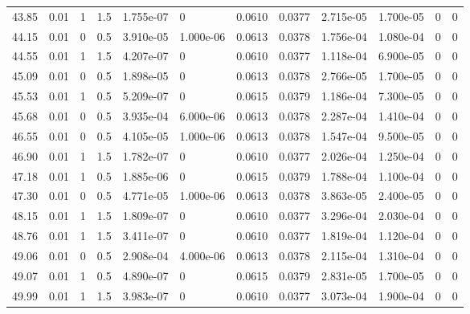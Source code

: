 \documentclass[preview]{standalone}
\begin{document}
{{{\begin{tabular}{L{1.2cm}C{1.2cm} C{0.3cm}C{0.5cm} C{1.4cm}C{1.4cm} C{1.4cm}C{1.4cm} C{1.6cm}C{1.6cm} C{1.6cm}C{1.6cm}}
  43.85  &  0.01  & 1     & 1.5 &  1.755e-07  & 0  &  0.0610&   0.0377& 2.715e-05 & 1.700e-05   &  0 & 0  \\ 
  44.15  &  0.01  & 0     & 0.5 &  3.910e-05  & 1.000e-06  &  0.0613&   0.0378& 1.756e-04 & 1.080e-04   &  0 & 0  \\ 
  44.55  &  0.01  & 1     & 1.5 &  4.207e-07  & 0  &  0.0610&   0.0377& 1.118e-04 & 6.900e-05   &  0 & 0  \\ 
  45.09  &  0.01  & 0     & 0.5 &  1.898e-05  & 0  &  0.0613&   0.0378& 2.766e-05 & 1.700e-05   &  0 & 0  \\ 
  45.53  &  0.01  & 1     & 0.5 &  5.209e-07  & 0  &  0.0615&   0.0379& 1.186e-04 & 7.300e-05   &  0 & 0  \\ 
  45.68  &  0.01  & 0     & 0.5 &  3.935e-04  & 6.000e-06  &  0.0613&   0.0378& 2.287e-04 & 1.410e-04   &  0 & 0  \\ 
  46.55  &  0.01  & 0     & 0.5 &  4.105e-05  & 1.000e-06  &  0.0613&   0.0378& 1.547e-04 & 9.500e-05   &  0 & 0  \\ 
  46.90  &  0.01  & 1     & 1.5 &  1.782e-07  & 0  &  0.0610&   0.0377& 2.026e-04 & 1.250e-04   &  0 & 0  \\ 
  47.18  &  0.01  & 1     & 0.5 &  1.885e-06  & 0  &  0.0615&   0.0379& 1.788e-04 & 1.100e-04   &  0 & 0  \\ 
  47.30  &  0.01  & 0     & 0.5 &  4.771e-05  & 1.000e-06  &  0.0613&   0.0378& 3.863e-05 & 2.400e-05   &  0 & 0  \\ 
  48.15  &  0.01  & 1     & 1.5 &  1.809e-07  & 0  &  0.0610&   0.0377& 3.296e-04 & 2.030e-04   &  0 & 0  \\ 
  48.76  &  0.01  & 1     & 1.5 &  3.411e-07  & 0  &  0.0610&   0.0377& 1.819e-04 & 1.120e-04   &  0 & 0  \\ 
  49.06  &  0.01  & 0     & 0.5 &  2.908e-04  & 4.000e-06  &  0.0613&   0.0378& 2.115e-04 & 1.310e-04   &  0 & 0  \\ 
  49.07  &  0.01  & 1     & 0.5 &  4.890e-07  & 0  &  0.0615&   0.0379& 2.831e-05 & 1.700e-05   &  0 & 0  \\ 
  49.99  &  0.01  & 1     & 1.5 &  3.983e-07  & 0  &  0.0610&   0.0377& 3.073e-04 & 1.900e-04   &  0 & 0  \\ 
\hline 
\end{tabular} 

}}}
\end{document}
